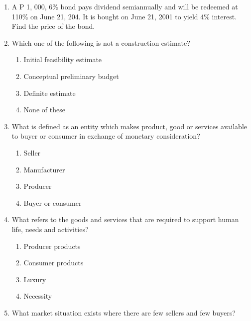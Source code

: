 \documentclass[11pt,a4paper]{article}
\begin{document}
\begin{enumerate}
\item{A P 1, 000, 6\% bond pays dividend semiannually and will be redeemed at 110\% on June 21, 204. It is bought on June 21, 2001 to yield 4\% interest. Find the price of the bond.}
\\
\item{Which one of the following is not a construction estimate?}
\begin{enumerate}[label=\Alph*.]
\item{Initial feasibility estimate}
\item{Conceptual preliminary budget}
\item{Definite estimate}
\item{None of these}
\end{enumerate}
\item{What is defined as an entity which makes product, good or services available to buyer or consumer in exchange of monetary consideration?}
\begin{enumerate}[label=\Alph*.]
\item{Seller}
\item{Manufacturer}
\item{Producer}
\item{Buyer or consumer}
\end{enumerate}
\item{What refers to the goods and services that are required to support human life, needs and activities?}
\begin{enumerate}[label=\Alph*.]
\item{Producer products}
\item{Consumer products}
\item{Luxury}
\item{Necessity}
\end{enumerate}
\item{What market situation exists where there are few sellers and few buyers?}
\begin{enumerate}[label=\Alph*.]

\end{enumerate}
\end{enumerate}
\end{document}
